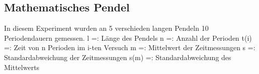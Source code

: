 \subsection{Mathematisches Pendel}
In diesem Experiment wurden an 5 verschieden langen Pendeln 10 Periodendauern gemessen.
\newline
l =: Länge des Pendels
\newline
n =: Anzahl der Perioden
\newline
t(i) =: Zeit von n Perioden im i-ten Versuch
\newline
m =: Mittelwert der Zeitmessungen
\newline
s =: Standardabweichung der Zeitmessungen
\newline
s(m) =: Standardabweichung des Mittelwerts
\begin{table}[thb]
	\centering
	\hline
\end{table}

